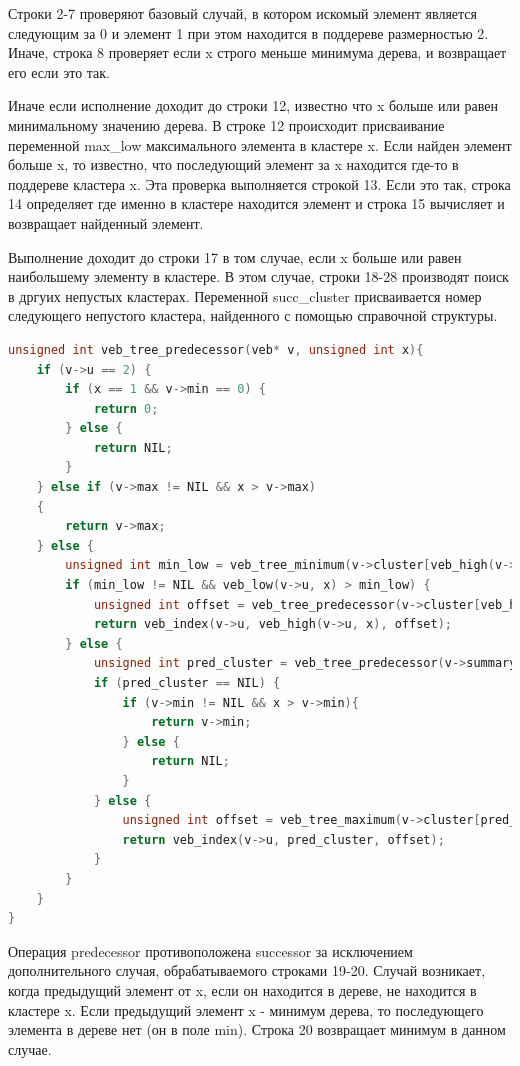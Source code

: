 \documentclass{article}
\begin{document}
Строки 2-7 проверяют базовый случай, в котором искомый элемент является следующим за 0 и элемент 1 при этом находится в поддереве размерностью 2. Иначе, строка 8 проверяет если x строго меньше минимума дерева, и возвращает его если это так.

Иначе если исполнение доходит до строки 12, известно что x больше или равен минимальному значению дерева. В строке 12 происходит присваивание переменной max\_low максимального элемента в кластере x. Если найден элемент больше x, то известно, что последующий элемент за x находится где-то в поддереве кластера x. Эта проверка выполняется строкой 13. Если это так, строка 14 определяет где именно в кластере находится элемент и строка 15 вычисляет и возвращает найденный элемент.

Выполнение доходит до строки 17 в том случае, если x больше или равен наибольшему элементу в кластере. В этом случае, строки 18-28 производят поиск в дргуих непустых кластерах. Переменной succ\_cluster присваивается номер следующего непустого кластера, найденного с помощью справочной структуры. \cite{ita}
\begin{lstlisting}[language=C,style=C]
unsigned int veb_tree_predecessor(veb* v, unsigned int x){
    if (v->u == 2) {
        if (x == 1 && v->min == 0) {
            return 0;
        } else {
            return NIL;
        }
    } else if (v->max != NIL && x > v->max)
    {
        return v->max;
    } else {
        unsigned int min_low = veb_tree_minimum(v->cluster[veb_high(v->u, x)]);
        if (min_low != NIL && veb_low(v->u, x) > min_low) {
            unsigned int offset = veb_tree_predecessor(v->cluster[veb_high(v->u, x)], veb_low(v->u, x));
            return veb_index(v->u, veb_high(v->u, x), offset);
        } else {
            unsigned int pred_cluster = veb_tree_predecessor(v->summary, veb_high(v->u, x));
            if (pred_cluster == NIL) {
                if (v->min != NIL && x > v->min){
                    return v->min;
                } else {
                    return NIL;
                }
            } else {
                unsigned int offset = veb_tree_maximum(v->cluster[pred_cluster]);
                return veb_index(v->u, pred_cluster, offset);
            }
        }
    }
}
\end{lstlisting}

Операция predecessor противоположена successor за исключением дополнительного случая, обрабатываемого строками 19-20. Случай возникает, когда предыдущий элемент от x, если он находится в дереве, не находится в кластере x. Если предыдущий элемент x - минимум дерева, то последующего элемента в дереве нет (он в поле min). Строка 20 возвращает минимум в данном случае. \cite{ita}
\end{document}
